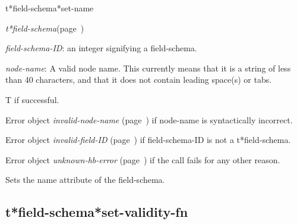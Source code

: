\begin{description}
\item [Name:]  t*field-schema*set-name

\item [Class:] {\sl t*field-schema}\hfill(page~\pageref{t*field-schema})

\item [Parameters:]
\item {\sl field-schema-ID}:  an integer signifying a field-schema.

\item {\sl node-name}:  
A valid node name. This currently means that it is a
string of less than 40 characters, and that it does
not contain leading space(s) or tabs.


\item [Return-value:]
T if successful.

Error object {\sl invalid-node-name} (page~\pageref{invalid-node-name}) if node-name
is syntactically incorrect.

Error object {\sl invalid-field-ID} (page~\pageref{invalid-field-ID}) if field-schema-ID
is not a t*field-schema.

Error object {\sl unknown-hb-error} (page~\pageref{unknown-hb-error}) if the call fails
for any other reason.

\item [Description:]

Sets the name attribute of the field-schema.

\item [Public:]



\end{description}
\horizontalline

\subsection{t*field-schema*set-validity-fn}
\label{t*field-schema*set-validity-fn}

